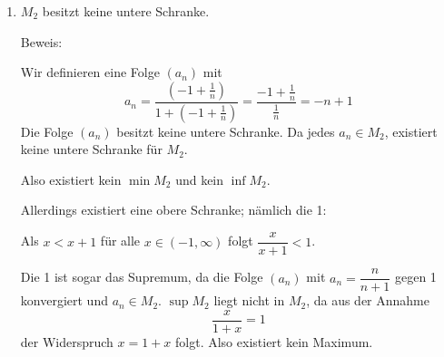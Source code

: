 \documentclass[a4paper,12pt]{article}
\begin{document}
\begin{enumerate}[label=\alph*)]
    \item $M_2$ besitzt keine untere Schranke.

    Beweis:

    Wir definieren eine Folge $(a_n)$ mit
    \[
        a_n = \frac{\left(-1+\frac{1}{n}\right)}{1 + \left(-1+\frac{1}{n}\right)}
        = \frac{-1+\frac{1}{n}}{\frac{1}{n}} = -n+1
    \]
    Die Folge $(a_n)$ besitzt keine untere Schranke.
    Da jedes $a_n \in M_2$, existiert keine untere Schranke für $M_2$.

    Also existiert kein $\min M_2$ und kein $\inf M_2$.

    Allerdings existiert eine obere Schranke; nämlich die 1:

    Als $x < x+1$ für alle $x \in (-1, \infty)$
    folgt $\dfrac{x}{x+1} < 1$.

    Die 1 ist sogar das Supremum, da
    die Folge $(a_n)$ mit $a_n = \dfrac{n}{n+1}$ gegen 1
    konvergiert und $a_n \in M_2$.
    $\sup M_2$ liegt nicht in $M_2$, da aus der Annahme
    \[
        \frac{x}{1+x} = 1
    \]
    der Widerspruch $x = 1+x$
    folgt.
    Also existiert kein Maximum.

\end{enumerate}
\end{document}
